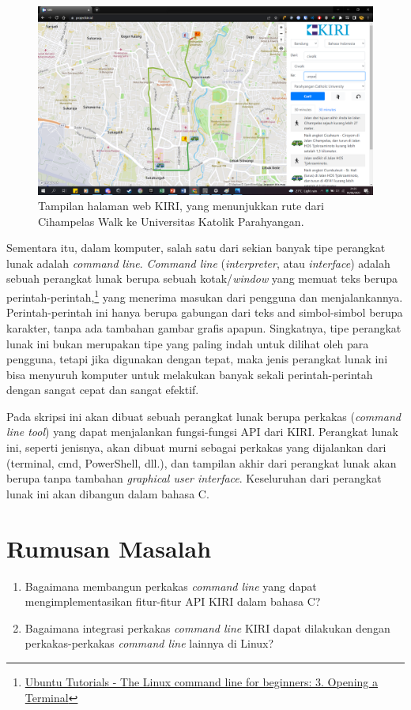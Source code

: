 \documentclass[a4paper,twoside]{article}
\begin{document}
\begin{figure}[ht]
    \centering
    \includegraphics[width=0.74\linewidth]{projectkiri-example}
    \caption[Tampilan halaman web KIRI]{Tampilan halaman web KIRI, yang menunjukkan rute dari Cihampelas Walk ke Universitas Katolik Parahyangan.}
    \label{fig:kiri-page}
\end{figure}

Sementara itu, dalam komputer, salah satu dari sekian banyak tipe perangkat lunak adalah \textit{command line}. \textit{\mbox{Command} line} (\cl \textit{interpreter}, atau \cl \textit{interface}) adalah sebuah perangkat lunak berupa sebuah kotak/\textit{window} yang memuat teks berupa perintah-perintah,\footnote{\href{https://ubuntu.com/tutorials/command-line-for-beginners\#3-opening-a-terminal}{Ubuntu Tutorials - The Linux command line for beginners: 3. Opening a Terminal}} yang menerima masukan dari pengguna dan  menjalankannya.\cite{marsh:2010:fatfreeintrotocommandline} Perintah-perintah ini hanya berupa gabungan dari teks and simbol-simbol berupa karakter, tanpa ada tambahan gambar grafis apapun. Singkatnya, tipe perangkat lunak ini bukan merupakan tipe yang paling indah untuk dilihat oleh para pengguna, tetapi jika digunakan dengan tepat, maka \mbox{jenis} \mbox{perangkat} lunak ini bisa menyuruh komputer untuk melakukan banyak sekali perintah-perintah dengan sangat cepat dan sangat efektif.

Pada skripsi ini akan dibuat sebuah perangkat lunak berupa perkakas \cl (\textit{command line tool}) yang dapat menjalankan fungsi-fungsi API dari KIRI. Perangkat lunak ini, seperti jenisnya, akan dibuat murni sebagai perkakas yang dijalankan dari \cl (terminal, cmd, PowerShell, dll.), dan tampilan akhir dari perangkat lunak akan berupa \cli tanpa tambahan \textit{graphical user interface}. Keseluruhan dari perangkat lunak ini akan dibangun dalam bahasa C.

\section{Rumusan Masalah}
\label{sec:rumusan}
\begin{enumerate}
	\item Bagaimana membangun perkakas \textit{command line} yang dapat mengimplementasikan fitur-fitur API KIRI dalam bahasa C?
	\item Bagaimana integrasi perkakas \textit{command line} KIRI dapat dilakukan dengan perkakas-perkakas \textit{command line} lainnya di Linux?
\end{enumerate}
\end{document}
